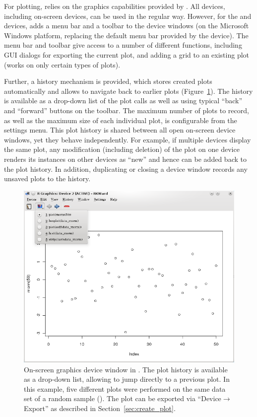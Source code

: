 For plotting,  relies on the graphics capabilities provided by
. All 
devices, including on{}-screen devices, can be used in the regular way.
However, for the  and  devices,  adds a menu
bar and a toolbar to the device windows (on the Microsoft Windows platform,
replacing the default menu bar provided by the device). The menu
bar and toolbar give access to a number of different functions,
including GUI dialogs for exporting the current plot,
and adding a grid to an existing plot 
(works on only certain types of plots).

Further, a history mechanism is provided,
which stores created plots automatically and allows to navigate
back to earlier plots (Figure~\ref{fig:plot_history}). 
The history is available as a drop-down list of the plot calls as well as using typical ``back''
and ``forward'' buttons on the toolbar.
The maximum number
of plots to record, as well as the maximum size of each individual plot,
is configurable from the settings menu. This plot history is shared
between all open on{}-screen device windows, yet they behave
independently. For example, if multiple devices display the same
plot, any modification (including deletion) of the plot on one device
renders its instances on other devices as ``new'' and hence can be added
back to the plot history. In addition, duplicating or closing a device
window records any unsaved plots to the history.

\begin{figure}[b!]
 \centering
 \includegraphics{./figures/plot_history_cropped.png}
 \caption{On{}-screen graphics device window in . The plot history is 
  available as a drop-down list, allowing to jump directly to a previous 
  plot. In this example, five different plots were performed on the same data 
  set of a random sample (). The plot can be 
  exported via ``Device$\rightarrow$Export'' as described in Section~\ref{sec:create_plot}.
}
 \label{fig:plot_history}
\end{figure}

